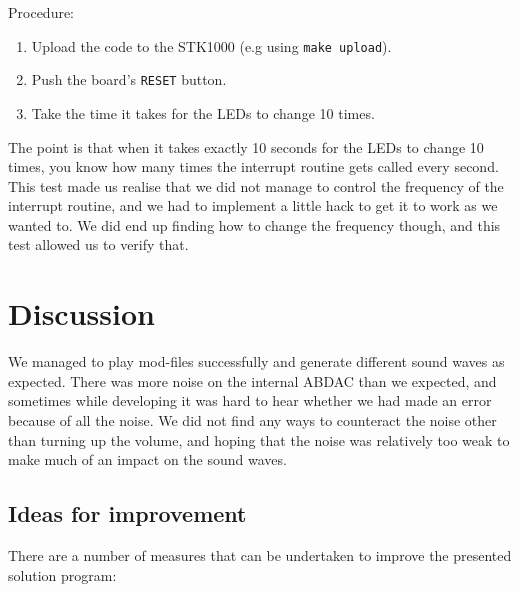 Procedure:
\begin{enumerate}
    \item{Upload the code to the STK1000 (e.g using \texttt{make upload}).}
    \item{Push the board's \texttt{RESET} button.}
    \item{Take the time it takes for the LEDs to change 10 times.}
\end{enumerate}

The point is that when it takes exactly 10 seconds for the LEDs to change 10 times, you know how many times the interrupt routine gets called every second.
This test made us realise that we did not manage to control the frequency of the interrupt routine, and we had to implement a little hack to get it to work as we wanted to.
We did end up finding how to change the frequency though, and this test allowed us to verify that.

\section{Discussion}

We managed to play mod-files successfully and generate different sound waves as expected.
There was more noise on the internal ABDAC than we expected, and sometimes while developing it was hard to hear whether we had made an error because of all the noise.
We did not find any ways to counteract the noise other than turning up the volume, and hoping that the noise was relatively too weak to make much of an impact on the sound waves.

\subsection{Ideas for improvement}

There are a number of measures that can be undertaken to improve the presented solution program:


